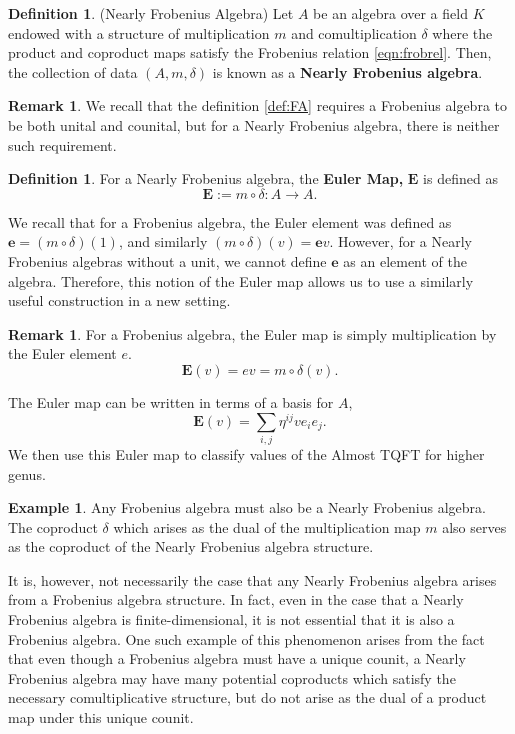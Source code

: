 \documentclass{amsart}
\newcommand{\be}{\begin{equation}}
\newcommand{\ee}{\end{equation}}
\newcommand{\eul}{\mathbf{e}}
\newcommand{\bige}{\mathbf{E}}
\theoremstyle{definition}
\newtheorem{Ex}[Lem]{Example}
\newtheorem{Def}[Lem]{Definition}
\newtheorem{Rmk}[Lem]{Remark}
\begin{document}
\begin{Def}
    (Nearly Frobenius Algebra) Let $A$ be an algebra over a field $K$ endowed with a structure of multiplication $m$ and comultiplication $\delta$ where the product and coproduct maps satisfy the Frobenius relation \ref{eqn:frobrel}. Then, the collection of data $(A,m,\delta)$ is known as a \textbf{Nearly Frobenius algebra}.
\end{Def}
\begin{Rmk}
	We recall that the definition \ref{def:FA} requires a Frobenius algebra to be both unital and counital, but for a Nearly Frobenius algebra, there is neither such requirement.
\end{Rmk}


\begin{Def}
	For a Nearly Frobenius algebra, the \textbf{Euler Map,} $\mathbf{E}$ is defined as
	\be \bige:=m\circ\delta:A\longrightarrow A.\ee
\end{Def}

\noindent We recall that for a Frobenius algebra, the Euler element was defined as $\eul=(m\circ\delta)(1)$, and similarly $(m\circ\delta)(v)=\eul v$. However, for a Nearly Frobenius algebras without a unit, we cannot define $\eul$ as an element of the algebra. Therefore, this notion of the Euler map allows us to use a similarly useful construction in a new setting.
\begin{Rmk}
	For a Frobenius algebra, the Euler map is simply multiplication by the Euler element $e$.  $$\bige(v)=ev=m\circ \delta(v).$$
\end{Rmk}
The Euler map can be written in terms of a basis for $A$, 
\be\label{eqn:EULbasis}
\bige(v)=\sum_{i,j}\eta^{ij}ve_ie_j.
\ee
We then use this Euler map to classify values of the Almost TQFT for higher genus. 



\begin{Ex}
	Any Frobenius algebra must also be a Nearly Frobenius algebra. The coproduct $\delta$ which arises as the dual of the multiplication map $m$ also serves as the coproduct of the Nearly Frobenius algebra structure.
\end{Ex}
\noindent It is, however, not necessarily the case that any Nearly Frobenius algebra arises from a Frobenius algebra structure. In fact, even in the case that a Nearly Frobenius algebra is finite-dimensional, it is not essential that it is also a Frobenius algebra. One such example of this phenomenon arises from the fact that even though a Frobenius algebra must have a unique counit, a Nearly Frobenius algebra may have many potential coproducts which satisfy the necessary comultiplicative structure, but do not arise as the dual of a product map under this unique counit.
\end{document}
